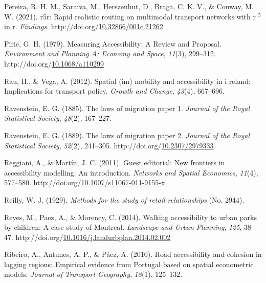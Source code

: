 \documentclass[
11pt, %
oneside, %
english, %
singlespacing, %
]{macthesis} %
\newlength{\cslhangindent}
\newenvironment{CSLReferences}[2] %
{\begin{list}{}{%
	\setlength{\itemindent}{0pt}
	\setlength{\leftmargin}{0pt}
	\setlength{\parsep}{0pt}
	\ifodd #1
	\setlength{\leftmargin}{\cslhangindent}
	\setlength{\itemindent}{-1\cslhangindent}
	\fi
	\setlength{\itemsep}{#2\baselineskip}}}
{\end{list}}
\begin{document}
\begin{CSLReferences}{1}{0}
Pereira, R. H. M., Saraiva, M., Herszenhut, D., Braga, C. K. V., \& Conway, M. W. (2021). r5r: Rapid realistic routing on multimodal transport networks with r \(^{\textrm{5}}\) in r. \emph{Findings}. http://doi.org/\href{https://doi.org/10.32866/001c.21262}{10.32866/001c.21262}

Pirie, G. H. (1979). Measuring {Accessibility}: {A} {Review} and {Proposal}. \emph{Environment and Planning A: Economy and Space}, \emph{11}(3), 299--312. http://doi.org/\href{https://doi.org/10.1068/a110299}{10.1068/a110299}

Rau, H., \& Vega, A. (2012). Spatial (im) mobility and accessibility in i reland: Implications for transport policy. \emph{Growth and Change}, \emph{43}(4), 667--696.

Ravenstein, E. G. (1885). The laws of migration paper 1. \emph{Journal of the Royal Statistical Society}, \emph{48}(2), 167--227.

Ravenstein, E. G. (1889). The laws of migration paper 2. \emph{Journal of the Royal Statistical Society}, \emph{52}(2), 241--305. http://doi.org/\href{https://doi.org/10.2307/2979333}{10.2307/2979333}

Reggiani, A., \& Martín, J. C. (2011). Guest editorial: New frontiers in accessibility modelling: An introduction. \emph{Networks and Spatial Economics}, \emph{11}(4), 577--580. http://doi.org/\href{https://doi.org/10.1007/s11067-011-9155-x}{10.1007/s11067-011-9155-x}

Reilly, W. J. (1929). \emph{Methods for the study of retail relationships} (No. 2944).

Reyes, M., Paez, A., \& Morency, C. (2014). Walking accessibility to urban parks by children: {A} case study of {Montreal}. \emph{Landscape and Urban Planning}, \emph{125}, 38--47. http://doi.org/\href{https://doi.org/10.1016/j.landurbplan.2014.02.002}{10.1016/j.landurbplan.2014.02.002}

Ribeiro, A., Antunes, A. P., \& Páez, A. (2010). Road accessibility and cohesion in lagging regions: {Empirical} evidence from {Portugal} based on spatial econometric models. \emph{Journal of Transport Geography}, \emph{18}(1), 125--132.


\end{CSLReferences}
\end{document}
